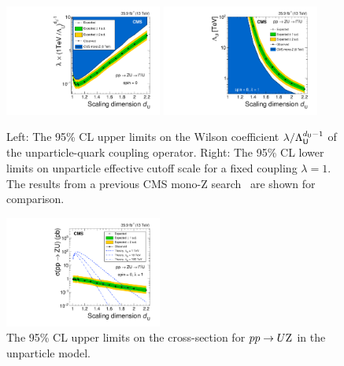 \begin{figure}[hbtp]
  \centering
   \includegraphics[width=0.46\textwidth]{figures/unparticles/limit_unparticle_alpha.pdf}
   \includegraphics[width=0.46\textwidth]{figures/unparticles/limit_unparticle_lambda_u_noref.pdf}
  \caption{
			Left: The 95\% CL upper limits on the Wilson coefficient $\lambda / \Lambda_{\textsf{U}}^{d_{\textsf{U}}-1}$ of the unparticle-quark coupling operator.
			Right: The 95\% CL lower limits on unparticle effective cutoff scale \LU for a fixed coupling $\lambda=1$.
			The results from a previous CMS mono-Z search~\cite{Khachatryan:2015bbl} are shown for comparison.
  }
  \label{fig:unparticleLimits}
\end{figure}
\begin{figure}[hbtp]
  \centering
   \includegraphics[width=0.46\textwidth]{figures/unparticles/limit_unparticle_xs.pdf}
  \caption{
			The 95\% CL upper limits on the cross-section for $pp\rightarrow U\mathrm{Z}$ in the unparticle model.
  }
  \label{fig:unparticleLimits2}
\end{figure}












